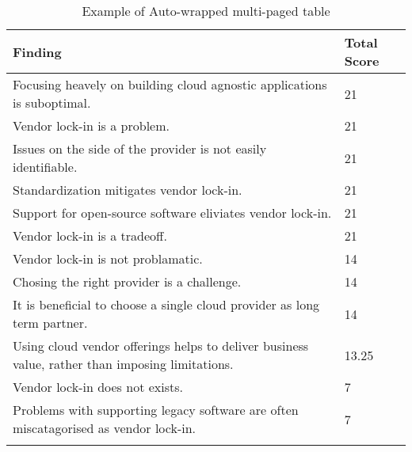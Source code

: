 
\renewcommand\arraystretch{1.5}%
\begin{longtable}{|p{10cm}|p{2cm}|}
\hline
\textbf{Finding}  & \textbf{Total Score} \\ \hline
\endhead
Focusing heavely on building cloud agnostic applications is suboptimal. & 21 \\ \hline
Vendor lock-in is a problem. & 21 \\ \hline
Issues on the side of the provider is not easily identifiable. & 21 \\ \hline
Standardization mitigates vendor lock-in. & 21 \\ \hline
Support for open-source software eliviates vendor lock-in. & 21 \\ \hline
Vendor lock-in is a tradeoff. & 21 \\ \hline
Vendor lock-in is not problamatic. & 14 \\ \hline
Chosing the right provider is a challenge. & 14 \\ \hline
It is beneficial to choose a single cloud provider as long term partner. & 14 \\ \hline
Using cloud vendor offerings helps to deliver business value, rather than imposing limitations. & 13.25 \\ \hline
Vendor lock-in does not exists. & 7 \\ \hline
Problems with supporting legacy software are often miscatagorised as vendor lock-in. & 7 \\ \hline
\caption{Example of Auto-wrapped multi-paged table}
\label{tab:table1}
\end{longtable}
